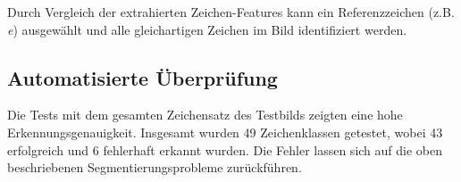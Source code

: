 Durch Vergleich der extrahierten Zeichen-Features kann ein Referenzzeichen (z.B. \textit{e}) ausgewählt und alle gleichartigen Zeichen im Bild identifiziert werden.



\subsection{Automatisierte Überprüfung}

Die Tests mit dem gesamten Zeichensatz des Testbilds zeigten eine hohe Erkennungsgenauigkeit. Insgesamt wurden 49 Zeichenklassen getestet, wobei 43 erfolgreich und 6 fehlerhaft erkannt wurden. Die Fehler lassen sich auf die oben beschriebenen Segmentierungsprobleme zurückführen.

